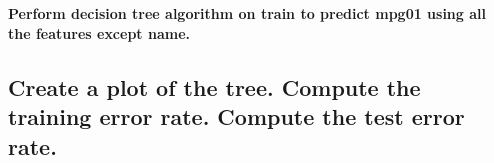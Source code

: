 \documentclass[
  12pt,
  oneside]{report}
\begin{document}
\newpage

\hypertarget{section-7}{%
\section{}\label{section-7}}

\textbf{Perform decision tree algorithm on train to predict mpg01 using all the features except name.}

\hypertarget{create-a-plot-of-the-tree.-compute-the-training-error-rate.-compute-the-test-error-rate.}{%
\subsection{Create a plot of the tree. Compute the training error rate. Compute the test error rate.}\label{create-a-plot-of-the-tree.-compute-the-training-error-rate.-compute-the-test-error-rate.}}


\singlespacing %
\end{document}
